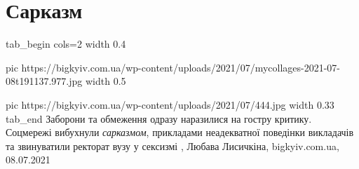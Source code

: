  
 
 
 
 
\chapter{Сарказм}

\ifcmt
tab_begin cols=2
	width 0.4

  pic https://bigkyiv.com.ua/wp-content/uploads/2021/07/mycollages-2021-07-08t191137.977.jpg
	width 0.5

	pic https://bigkyiv.com.ua/wp-content/uploads/2021/07/444.jpg
	width 0.33
tab_end
\fi
Заборони та обмеження одразу наразилися на гостру критику. Соцмережі вибухнули
\emph{сарказмом}, прикладами неадекватної поведінки викладачів та звинуватили
ректорат вузу у сексизмі
, 
Любава Лисичкіна, bigkyiv.com.ua, 08.07.2021
